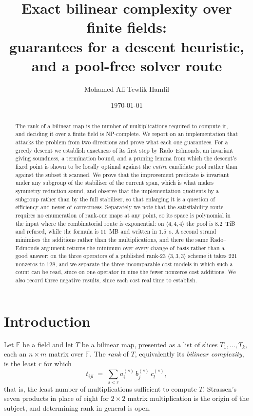 \documentclass[11pt,reqno]{amsart}
\title[Exact bilinear complexity over finite fields]
      {Exact bilinear complexity over finite fields:\\
       guarantees for a descent heuristic, and a pool-free solver route}
\author{Mohamed Ali Tewfik Hamlil}
\date{\today}
\theoremstyle{plain}
\theoremstyle{definition}
\theoremstyle{remark}
\newcommand{\GF}{\mathbb{F}}
\begin{document}
\begin{abstract}
The rank of a bilinear map is the number of multiplications required to compute
it, and deciding it over a finite field is NP-complete. We report on an
implementation that attacks the problem from two directions and prove what each
one guarantees. For a greedy descent we establish exactness of its first step by
Rado--Edmonds, an invariant giving soundness, a termination bound, and a pruning
lemma from which the descent's fixed point is shown to be locally optimal against
the \emph{entire} candidate pool rather than against the subset it scanned. We
prove that the improvement predicate is invariant under any subgroup of the
stabiliser of the current span, which is what makes symmetry reduction sound, and
observe that the implementation quotients by a subgroup rather than by the full
stabiliser, so that enlarging it is a question of efficiency and never of
correctness. Separately we note that the satisfiability route requires no
enumeration of rank-one maps at any point, so its space is polynomial in the
input where the combinatorial route is exponential: on $\langle 4,4,4\rangle$
the pool is $8.2$~TiB and refused, while the formula is $11$~MB and written in
$1.5$~s. A second strand minimises the additions rather than the
multiplications, and there the same Rado--Edmonds argument returns the minimum
over every change of basis rather than a good answer: on the three operators of
a published rank-23 $\langle 3,3,3\rangle$ scheme it takes $221$ nonzeros to
$128$, and we separate the three incomparable cost models in which such a count
can be read, since on one operator in nine the fewer nonzeros cost additions. We also record three
negative results, since each cost real time to establish.
\end{abstract}

\maketitle

\section{Introduction}

Let $\GF$ be a field and let $T$ be a bilinear map, presented as a list of
slices $T_1,\dots,T_k$, each an $n\times m$ matrix over $\GF$. The
\emph{rank} of $T$, equivalently its \emph{bilinear complexity}, is the least
$r$ for which
\[
  t_{ijl} \;=\; \sum_{s<r} a^{(s)}_i\, b^{(s)}_j\, c^{(s)}_l ,
\]
that is, the least number of multiplications sufficient to compute $T$.
Strassen's seven products in place of eight for $2\times 2$ matrix
multiplication is the origin of the subject, and determining rank in general is
open.
\end{document}
